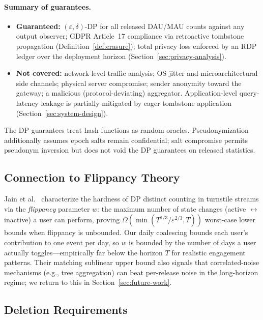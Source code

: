 \documentclass[sigconf,anonymous,review]{acmart}
\begin{document}
\paragraph{Summary of guarantees.}
\begin{itemize}
    \item[\checkmark] \textbf{Guaranteed:} $(\varepsilon, \delta)$-DP for all released DAU/MAU counts against any output observer; GDPR Article~17 compliance via retroactive tombstone propagation (Definition~\ref{def:erasure}); total privacy loss enforced by an RDP ledger over the deployment horizon (Section~\ref{sec:privacy-analysis}).
    \item[$\times$] \textbf{Not covered:} network-level traffic analysis; OS jitter and microarchitectural side channels; physical server compromise; sender anonymity toward the gateway; a malicious (protocol-deviating) aggregator. Application-level query-latency leakage is partially mitigated by eager tombstone application (Section~\ref{sec:system-design}).
\end{itemize}

The DP guarantees treat hash functions as random oracles. Pseudonymization additionally assumes epoch salts remain confidential; salt compromise permits pseudonym inversion but does not void the DP guarantees on released statistics.

\subsection{Connection to Flippancy Theory}
Jain et al.~\cite{Flippancy2023} characterize the hardness of DP distinct counting in turnstile streams via the \emph{flippancy} parameter $w$: the maximum number of state changes (active $\leftrightarrow$ inactive) a user can perform, proving $\Omega(\min(T^{1/3}/\varepsilon^{2/3}, T))$ worst-case lower bounds when flippancy is unbounded. Our daily coalescing bounds each user's contribution to one event per day, so $w$ is bounded by the number of days a user actually toggles---empirically far below the horizon $T$ for realistic engagement patterns. Their matching sublinear upper bound also signals that correlated-noise mechanisms (e.g., tree aggregation) can beat per-release noise in the long-horizon regime; we return to this in Section~\ref{sec:future-work}.

\subsection{Deletion Requirements}
\end{document}
